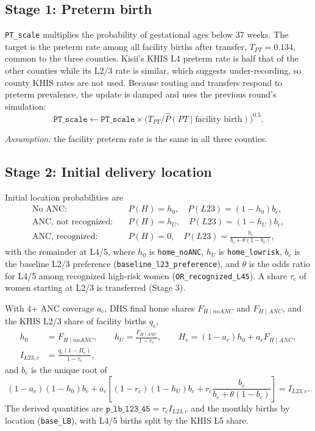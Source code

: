 \documentclass[11pt]{article}
\newcommand{\p}[1]{\texttt{#1}}
\begin{document}
\subsection{Stage 1: Preterm birth}

\p{PT\_scale} multiplies the probability of gestational ages below 37 weeks. The
target is the preterm rate among all facility births after transfer,
$T_{PT}=0.134$, common to the three counties. Kisii's KHIS L4 preterm rate is
half that of the other counties while its L2/3 rate is similar, which suggests
under-recording, so county KHIS rates are not used. Because routing and
transfers respond to preterm prevalence, the update is damped and uses the
previous round's simulation:
\begin{equation}
\p{PT\_scale}\leftarrow\p{PT\_scale}\times
\bigl(T_{PT}/\widehat P(PT\mid\text{facility birth})\bigr)^{0.5}.
\end{equation}

\emph{Assumption:} the facility preterm rate is the same in all three counties.

\subsection{Stage 2: Initial delivery location}

Initial location probabilities are
\begin{align}
\text{No ANC:}\quad & P(H)=h_0,\quad P(L23)=(1-h_0)b_c,\\
\text{ANC, not recognized:}\quad & P(H)=h_U,\quad P(L23)=(1-h_U)b_c,\\
\text{ANC, recognized:}\quad & P(H)=0,\quad P(L23)=\frac{b_c}{b_c+\theta(1-b_c)},
\end{align}
with the remainder at L4/5, where $h_0$ is \p{home\_noANC}, $h_U$ is
\p{home\_lowrisk}, $b_c$ is the baseline L2/3 preference
(\p{baseline\_l23\_preference}), and $\theta$ is the odds ratio for L4/5 among
recognized high-risk women (\p{OR\_recognized\_L45}). A share $\tau_c$ of women
starting at L2/3 is transferred (Stage 3).

With 4+ ANC coverage $a_c$, DHS final home shares $F_{H\mid noANC}$ and
$F_{H\mid ANC}$, and the KHIS L2/3 share of facility births $q_c$,
\begin{align}
h_0&=F_{H\mid noANC},\qquad h_U=\frac{F_{H\mid ANC}}{1-r_c},\qquad
H_c=(1-a_c)h_0+a_cF_{H\mid ANC},\\
I_{L23,c}&=\frac{q_c(1-H_c)}{1-\tau_c},
\end{align}
and $b_c$ is the unique root of
\begin{equation}
(1-a_c)(1-h_0)b_c+a_c\left[(1-r_c)(1-h_U)b_c+r_c\frac{b_c}{b_c+\theta(1-b_c)}\right]=I_{L23,c}.
\end{equation}
The derived quantities are $\p{p\_lb\_l23\_45}=\tau_cI_{L23,c}$ and the
monthly births by location (\p{base\_LB}), with L4/5 births split by the KHIS
L5 share.
\end{document}
